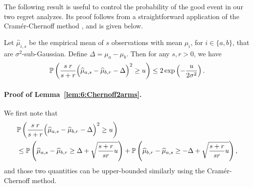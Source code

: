 The following result is useful to control the probability of the good event in our two regret analyzes.
Its proof follows from a straightforward application of the Cram\'er-Chernoff method \cite{Boucheron2013}, and is given below.

\begin{lemma}\label{lem:6:Chernoff2arms}
    Let $\widehat{\mu}_{i,s}$ be the empirical mean of $s$ \iid{} observations with mean $\mu_i$, for $i \in \{a,b\}$, that are $\sigma^2$-sub-Gaussian. Define $\Delta = \mu_a - \mu_b$. Then for any $s,r > 0$, we have
    \begin{equation}
        \mathbb{P}\left(\frac{s \; r}{s+r}\Big(\widehat{\mu}_{a,s} - \widehat{\mu}_{b,r} - \Delta\Big)^2 \geq u \right) \leq 2\exp\left(- \frac{u}{2\sigma^2}\right).
    \end{equation}
\end{lemma}


\paragraph{Proof of Lemma~\ref{lem:6:Chernoff2arms}.}

We first note that
\begin{align}\label{eq:6:Preparation}
	&\mathbb{P}\left(\frac{s \; r}{s+r}\Big(\widehat{\mu}_{a,s} - \widehat{\mu}_{b,r} - \Delta\Big)^2 \geq u \right) \nonumber\\
	&\leq \mathbb{P}\left(\widehat{\mu}_{a,s} - \widehat{\mu}_{b,r} \geq \Delta + \sqrt{\frac{s+r}{sr}u} \right) + \mathbb{P}\left(\widehat{\mu}_{b,r} - \widehat{\mu}_{a,s} \geq -\Delta + \sqrt{\frac{s+r}{sr}u} \right),
\end{align}
and those two quantities can be upper-bounded similarly using the Cram\'er-Chernoff method.

